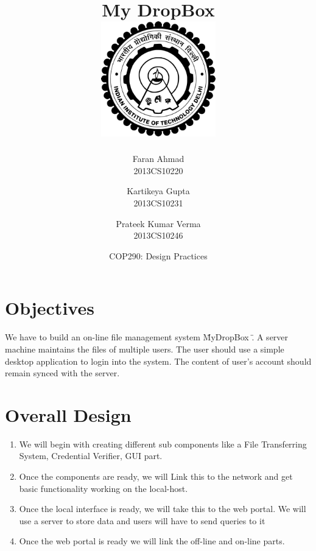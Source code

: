 \documentclass{article}
\title{\vspace*{\fill} My DropBox \\
	\vspace{3mm} \includegraphics[width=5cm]{logo.png}}
\author{
	Faran Ahmad\\
	2013CS10220
	\and
	Kartikeya Gupta\\ 
	2013CS10231
	\and
	Prateek Kumar Verma\\ 
	2013CS10246
}
\date{COP290: Design Practices \vspace*{\fill}}
\begin{document}
	\maketitle

	\newpage

	\section{Objectives}
	We have to build an on-line file management system \" MyDropBox \". A server machine maintains the files of multiple users. The user should use a simple desktop application to login into the system. The content of user's account should remain synced with the server. 

	\section{Overall Design}
		\begin{enumerate}
			\item We will begin with creating different sub components like a File Transferring System, Credential Verifier, GUI part.
			\item Once the components are ready, we will Link this to the network and get basic functionality working on the local-host.
			\item Once the local interface is ready, we will take this to the web portal. We will use a server to store data and users will have to send queries to it
			\item Once the web portal is ready we will link the off-line and on-line parts.
		\end{enumerate}
\end{document}
